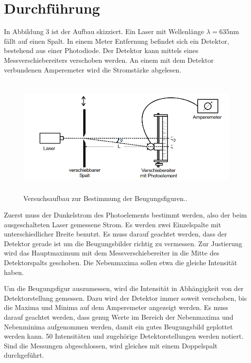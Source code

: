 \section{Durchführung}
\label{sec:Durchführung}

In Abbildung 3 ist der Aufbau skizziert. Ein Laser mit Wellenlänge $\lambda = 635 \si{\nano\meter}$ fällt auf einen Spalt. In einem Meter Entfernung befindet sich ein Detektor, bestehend aus einer Photodiode. Der Detektor kann mittels eines Messverschiebereiters verschoben werden.
An einem mit dem Detektor verbundenen Amperemeter wird die Stromstärke abgelesen.
\begin{figure}[H]
  \centering
  \includegraphics[height=6cm]{aufbau.PNG}
  \caption{Versuchsaufbau zur Bestimmung der Beugungsfiguren.\cite{kent}.}
\end{figure}

\noindent Zuerst muss der Dunkelstrom des Photoelements bestimmt werden, also der beim ausgeschalteten Laser gemessene Strom.
Es werden zwei Einzelspalte mit unterschiedlicher Breite benutzt. Es muss darauf geachtet werden, dass der Detektor gerade ist um die Beugungsbilder richtig zu vermessen.
Zur Justierung wird das Hauptmaximum mit dem Messverschiebereiter in die Mitte des Detektorspalts geschoben. Die Nebenmaxima sollen etwa die gleiche Intensität haben.

\noindent Um die Beugungsfigur auszumessen, wird die Intensität in Abhängigkeit von der Detektorstellung gemessen. Dazu wird der Detektor immer soweit verschoben, bis die Maxima und Minima auf dem Amperemeter angezeigt werden. Es muss darauf geachtet werden, dass genug Werte im Bereich der Nebenmaxima und Nebenminima aufgenommen werden, damit ein gutes Beugungsbild geplottet werden kann.
50 Intensitäten und zugehörige Detektorstellungen werden notiert. 
Sind die Messungen abgeschlossen, wird gleiches mit einem Doppelspalt durchgeführt.
